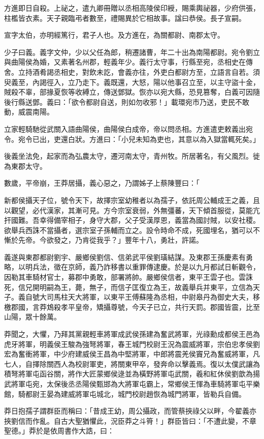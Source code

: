 \begin{pinyinscope}
方進即日自殺。上祕之，遣九卿冊贈以丞相高陵侯印綬，賜乘輿祕器，少府供張，柱檻皆衣素。天子親臨弔者數至，禮賜異於它相故事。諡曰恭侯。長子宣嗣。

宣字太伯，亦明經篤行，君子人也。及方進在，為關都尉、南郡太守。

少子曰義。義字文仲，少以父任為郎，稍遷諸曹，年二十出為南陽都尉。宛令劉立與曲陽侯為婚，又素著名州郡，輕義年少。義行太守事，行縣至宛，丞相史在傳舍。立持酒肴謁丞相史，對飲未訖，會義亦往，外吏白都尉方至，立語言自若。須臾義至，內謁徑入，立乃走下。義既還，大怒，陽以他事召立至，以主守盜十金，賊殺不辜，部掾夏恢等收縛立，傳送鄧獄。恢亦以宛大縣，恐見篡奪，白義可因隨後行縣送鄧。義曰：「欲令都尉自送，則如勿收邪！」載環宛市乃送，吏民不敢動，威震南陽。

立家輕騎馳從武關入語曲陽侯，曲陽侯白成帝，帝以問丞相。方進遣吏敕義出宛令。宛令已出，吏還白狀。方進曰：「小兒未知為吏也，其意以為入獄當輒死矣。」

後義坐法免，起家而為弘農太守，遷河南太守，青州牧。所居著名，有父風烈。徙為東郡太守。

數歲，平帝崩，王莽居攝，義心惡之，乃謂姊子上蔡陳豐曰：「

新都侯攝天子位，號令天下，故擇宗室幼稚者以為孺子，依託周公輔成王之義，且以觀望，必代漢家，其漸可見。方今宗室衰弱，外無彊蕃，天下傾首服從，莫能亢扞國難。吾幸得備宰相子，身守大郡，父子受漢厚恩，義當為國討賊，以安社稷。欲舉兵西誅不當攝者，選宗室子孫輔而立之。設令時命不成，死國埋名，猶可以不慚於先帝。今欲發之，乃肯從我乎？」豐年十八，勇壯，許諾。

義遂與東郡都尉劉宇、嚴鄉侯劉信、信弟武平侯劉璜結謀。及東郡王孫慶素有勇略，以明兵法，徵在京師，義乃詐移書以重罪傳逮慶。於是以九月都試日斬觀令，因勒其車騎材官士，募郡中勇敢，部署將帥。嚴鄉侯信者，東平王雲子也。雲誅死，信兄開明嗣為王，薨，無子，而信子匡復立為王，故義舉兵并東平，立信為天子。義自號大司馬柱天大將軍，以東平王傅蘇隆為丞相，中尉皋丹為御史大夫，移檄郡國，言莽鴆殺孝平皇帝，矯攝尊號，今天子已立，共行天罰。郡國皆震，比至山陽，眾十餘萬。

莽聞之，大懼，乃拜其黨親輕車將軍成武侯孫建為奮武將軍，光祿勳成都侯王邑為虎牙將軍，明義侯王駿為強弩將軍，春王城門校尉王況為震威將軍，宗伯忠孝侯劉宏為奮衝將軍，中少府建威侯王昌為中堅將軍，中郎將震羌侯竇兄為奮威將軍，凡七人，自擇除關西人為校尉軍吏，將關東甲卒，發奔命以擊義焉。復以太僕武讓為積弩將軍屯函谷關，將作大匠蒙鄉侯逯並為橫野將軍屯武關，羲和紅休侯劉歆為揚武將軍屯宛，太保後丞丞陽侯甄邯為大將軍屯霸上，常鄉侯王惲為車騎將軍屯平樂館，騎都尉王晏為建威將軍屯城北，城門校尉趙恢為城門將軍，皆勒兵自備。

莽日抱孺子謂群臣而稱曰：「昔成王幼，周公攝政，而管蔡挾祿父以畔，今翟義亦挾劉信而作亂。自古大聖猶懼此，況臣莽之斗筲！」群臣皆曰：「不遭此變，不章聖德。」莽於是依周書作大誥，曰：


\end{pinyinscope}
